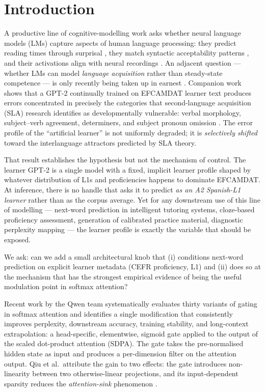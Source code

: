 \section{Introduction}
\label{sec:introduction}

A productive line of cognitive-modelling work asks whether neural
language models (LMs) capture aspects of human language processing: they
predict reading times through surprisal
\citep{levy2008expectation,wilcox2020predictive}, they match syntactic
acceptability patterns \citep{warstadt2020blimp}, and their activations
align with neural recordings \citep{schrimpf2021neural}. An adjacent
question --- whether LMs can model \emph{language acquisition} rather
than steady-state competence --- is only recently being taken up in
earnest \citep{stearns2026artificial}. Companion work shows that a
GPT-2 continually trained on EFCAMDAT learner text produces errors
concentrated in precisely the categories that second-language acquisition
(SLA) research identifies as developmentally vulnerable: verbal
morphology, subject--verb agreement, determiners, and subject pronoun
omission \citep{stearns2026artificial,geertzen2014efcamdat,
goldschneider2001explaining}. The error profile of the ``artificial
learner'' is not uniformly degraded; it is \emph{selectively shifted}
toward the interlanguage attractors predicted by SLA theory.

That result establishes the hypothesis but not the mechanism of control.
The learner GPT-2 is a single model with a fixed, implicit learner
profile shaped by whatever distribution of L1s and proficiencies happens
to dominate EFCAMDAT. At inference, there is no handle that asks it to
predict \emph{as an A2 Spanish-L1 learner} rather than as the corpus
average. Yet for any downstream use of this line of modelling ---
next-word prediction in intelligent tutoring systems, cloze-based
proficiency assessment, generation of calibrated practice material,
diagnostic perplexity mapping \citep{stearns2025nwpaleval} --- the
learner profile is exactly the variable that should be exposed.

We ask: can we add a small architectural knob that (i) conditions
next-word prediction on explicit learner metadata (CEFR proficiency, L1)
and (ii) does so at the mechanism that has the strongest empirical
evidence of being the useful modulation point in softmax attention?

Recent work by the Qwen team \citep{qiu2025gated} systematically
evaluates thirty variants of gating in softmax attention and identifies
a single modification that consistently improves perplexity, downstream
accuracy, training stability, and long-context extrapolation: a
head-specific, elementwise, sigmoid gate applied to the output of the
scaled dot-product attention (SDPA). The gate takes the pre-normalised
hidden state as input and produces a per-dimension filter on the attention
output. Qiu et al.~attribute the gain to two effects: the gate introduces
non-linearity between two otherwise-linear projections, and its
input-dependent sparsity reduces the \emph{attention-sink} phenomenon
\citep{xiao2023efficient}.

